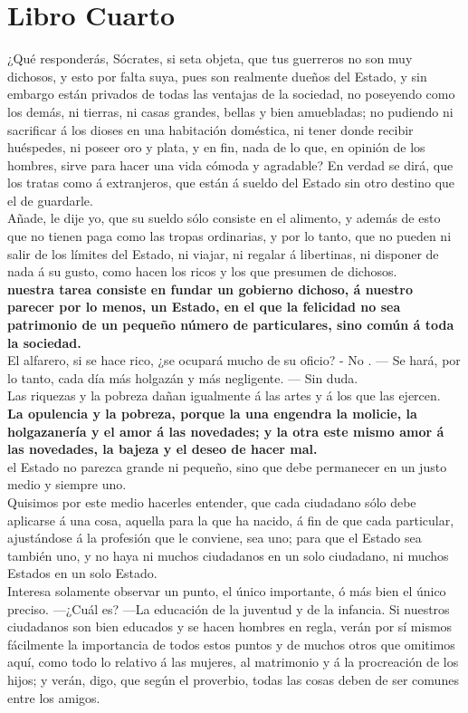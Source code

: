 \documentclass[10pt]{book}
\begin{document}
\chapter*{Libro Cuarto}
 ¿Qué responderás, Sócrates, si seta objeta, que tus guerreros no son muy dichosos, y esto por falta suya, pues son realmente dueños del Estado, y sin embargo están privados de todas las ventajas de la sociedad, no poseyendo como los demás, ni tierras, ni casas grandes, bellas y bien amuebladas; no pudiendo ni sacrificar á los dioses en una habitación doméstica, ni tener donde recibir huéspedes, ni poseer oro y plata, y en fin, nada de lo que, en opinión de los hombres, sirve para hacer una vida cómoda y agradable? En verdad se dirá, que los tratas como á extranjeros, que están á sueldo del Estado sin otro destino que el de guardarle.\\ Añade, le dije yo, que su sueldo sólo consiste en el alimento, y además de esto que no tienen paga como las tropas ordinarias, y por lo tanto, que no pueden ni salir de los límites del Estado, ni viajar, ni regalar á libertinas, ni disponer de nada á su gusto, como hacen los ricos y los que presumen de dichosos. \\
\textbf{nuestra tarea consiste en fundar un gobierno dichoso, á nuestro parecer por lo menos, un Estado, en el que la felicidad no sea patrimonio de un pequeño número de particulares, sino común á toda la sociedad.}\\
El alfarero, si se hace rico, ¿se ocupará mucho de su oficio? - No . — Se hará, por lo tanto, cada día más holgazán y más negligente. — Sin duda. \\
Las riquezas y la pobreza dañan igualmente á  las artes y á los que las ejercen.\\
\textbf{La opulencia y la pobreza, porque la una engendra la molicie, la holgazanería y el amor á las novedades; y la otra este mismo amor á las novedades, la bajeza y el deseo de hacer mal.}\\
el Estado no parezca grande ni pequeño, sino que debe permanecer en un justo medio y siempre uno. \\
Quisimos por este medio hacerles entender, que cada ciudadano sólo debe aplicarse á una cosa, aquella para la que ha nacido, á fin de que cada particular, ajustándose á la profesión que le conviene, sea uno; para que el Estado sea también uno, y no haya ni muchos ciudadanos en un solo ciudadano, ni muchos Estados en un solo Estado.\\
Interesa solamente observar un punto, el único importante, ó más bien el único preciso. —¿Cuál es? —La educación de la juventud y de la infancia. Si nuestros ciudadanos son bien educados y se hacen hombres en regla, verán por sí mismos fácilmente la importancia de todos estos puntos y de muchos otros que omitimos aquí, como todo lo relativo á las mujeres, al matrimonio y á la procreación de los hijos; y verán, digo, que según el proverbio, todas las cosas deben de ser comunes entre los amigos. \\
\end{document}
